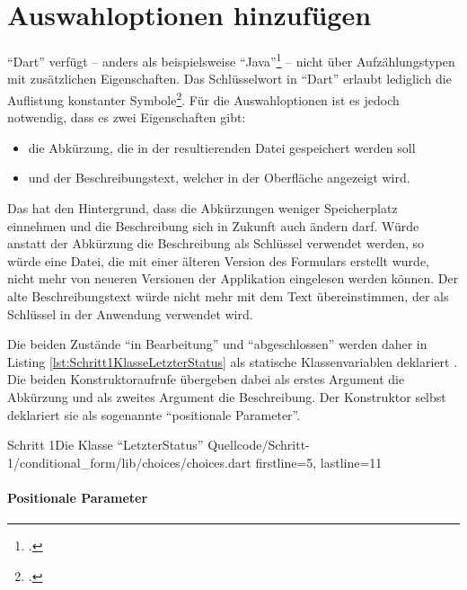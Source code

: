 \section{Auswahloptionen hinzufügen}

\enquote{Dart} verfügt -- anders als beispielsweise \enquote{Java}\footcite[Vgl.][S. 321]{TheJavaLanguageSpecificationJavaSE16Edition} -- nicht über Aufzählungstypen mit zusätzlichen Eigenschaften.
Das Schlüsselwort  in \enquote{Dart} erlaubt lediglich die Auflistung konstanter Symbole\footcite[Vgl.][S. 74f.]{DartProgrammingLanguageSpecification5thedition}.
Für die Auswahloptionen ist es jedoch notwendig, dass es zwei Eigenschaften gibt:
\begin{itemize}
  \parsep 0pt
  \topsep 0pt
  \itemsep 0pt

  \item die Abkürzung, die in der resultierenden Datei gespeichert werden soll
  \item und der Beschreibungstext, welcher in der Oberfläche angezeigt wird.
\end{itemize}
Das hat den Hintergrund, dass die Abkürzungen weniger Speicherplatz einnehmen und die Beschreibung sich in Zukunft auch ändern darf.
Würde anstatt der Abkürzung die Beschreibung als Schlüssel verwendet werden, so würde eine Datei, die mit einer älteren Version des Formulars erstellt wurde, nicht mehr von neueren Versionen der Applikation eingelesen werden können.
Der alte Beschreibungstext würde nicht mehr mit dem Text übereinstimmen, der als Schlüssel in der Anwendung verwendet wird.


Die beiden Zustände \enquote{in Bearbeitung} und \enquote{abgeschlossen} werden daher in Listing \ref{lst:Schritt1KlasseLetzterStatus} als statische Klassenvariablen deklariert .
Die beiden Konstruktoraufrufe übergeben dabei als erstes Argument die Abkürzung und als zweites Argument die Beschreibung.
Der Konstruktor selbst  deklariert sie als sogenannte \enquote{positionale Parameter}.



\begin{alexlisting}{Schritt 1}{Die Klasse \enquote{LetzterStatus}}
  {Quellcode/Schritt-1/conditional_form/lib/choices/choices.dart}
  {firstline=5, lastline=11}
  \label{lst:Schritt1KlasseLetzterStatus}
\end{alexlisting}



\paragraph{Positionale Parameter}

